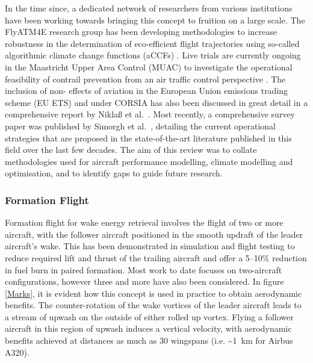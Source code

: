In the time since, a dedicated network of researchers from various institutions have been working towards bringing this concept to fruition on a large scale. The FlyATM4E research group has been developing methodologies to increase robustness in the determination of eco-efficient flight trajectories using so-called algorithmic climate change functions (aCCFs) \cite{Matthes2020}. Live trials are currently ongoing in the Maastricht Upper Area Control (MUAC) to investigate the operational feasibility of contrail prevention from an air traffic control perspective \cite{MUAC2021}. The inclusion of non- effects of aviation in the European Union emissions trading scheme (EU ETS) and under CORSIA has also been discussed in great detail in a comprehensive report by Nikla{\ss} et al.\ \cite{Niklass2019b}. Most recently, a comprehensive survey paper was published by Simorgh et al.\ \cite{Simorgh2022}, detailing the current operational strategies that are proposed in the state-of-the-art literature published in this field over the last few decades. The aim of this review was to collate methodologies used for aircraft performance modelling, climate modelling and optimisation, and to identify gaps to guide future research.




\subsubsection{Formation Flight}
\label{Formation_flight}
Formation flight for wake energy retrieval involves the flight of two or more aircraft, with the follower aircraft positioned in the smooth updraft of the leader aircraft's wake. This has been demonstrated in simulation \cite{Venkataramanan2003, Bangash2004} and flight testing \cite{Hanson2002} to reduce required lift and thrust of the trailing aircraft and offer a 5--10\% reduction in fuel burn in paired formation. Most work to date focuses on two-aircraft configurations, however three \cite{Bower2009} and more have also been considered. In figure \ref{Marks}, it is evident how this concept is used in practice to obtain aerodynamic benefits. The counter-rotation of the wake vortices of the leader aircraft leads to a stream of upwash on the outside of either rolled up vortex. Flying a follower aircraft in this region of upwash induces a vertical velocity, with aerodynamic benefits achieved at distances as much as 30 wingspans (i.e. \textasciitilde1~km for Airbus A320).

